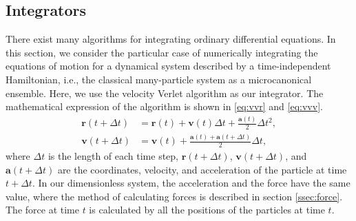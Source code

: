 \subsection{Integrators}

There exist many algorithms for integrating ordinary differential equations.
In this section, we consider the particular case of numerically integrating the equations of
motion for a dynamical system described by a time-independent Hamiltonian, i.e., the
classical many-particle system as a microcanonical ensemble.
Here, we use the velocity Verlet algorithm as our integrator.
The mathematical expression of the algorithm is shown in \eqref{eq:vvr} and \eqref{eq:vvv}.
%
\begin{align}
    \bm{r}(t + \Delta t) & = \bm{r}(t) + \bm{v}(t) \Delta t + \frac{ \bm{a}(t) }{ 2 } \Delta t^2,\label{eq:vvr} \\
    \bm{v}(t + \Delta t) & = \bm{v}(t) + \frac{ \bm{a}(t) + \bm{a}(t + \Delta t) }{ 2 } \Delta t,\label{eq:vvv}
\end{align}
%
where $\Delta t$ is the length of each time step, $\bm{r}(t + \Delta t)$,
$\bm{v}(t + \Delta t)$, and $\bm{a}(t + \Delta t)$
are the coordinates, velocity, and acceleration of the particle at time $t + \Delta t$.
In our dimensionless system, the acceleration and the force have the same value,
where the method of calculating forces is described in section \ref{ssec:force}.
The force at time $t$ is calculated by all the positions of the particles at time $t$.

